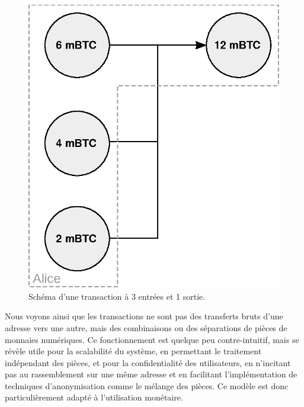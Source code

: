 \begin{figure}[ht]
  \centering
  \includegraphics[scale=0.75]{img/transaction-3i-1o.eps}
  \caption{Schéma d'une transaction à 3 entrées et 1 sortie.}
  \label{fig:transaction-3i-1o}
\end{figure}

Nous voyons ainsi que les transactions ne sont pas des transferts bruts d'une adresse vers une autre, mais des combinaisons ou des séparations de pièces de monnaies numériques. Ce fonctionnement est quelque peu contre-intuitif, mais se révèle utile pour la scalabilité du système, en permettant le traitement indépendant des pièces, et pour la confidentialité des utilisateurs, en n'incitant pas au rassemblement sur une même adresse et en facilitant l'implémentation de techniques d'anonymisation comme le mélange des pièces. Ce modèle est donc particulièrement adapté à l'utilisation monétaire.

%
%

